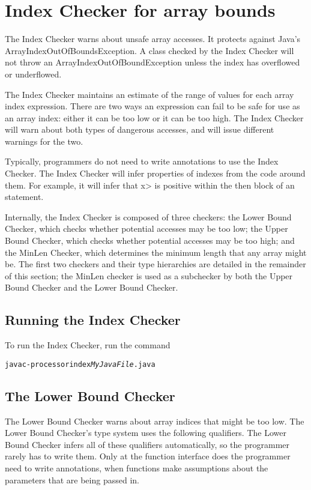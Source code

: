\chapter{Index Checker for array bounds\label{index-checker}}

The Index Checker warns about unsafe array accesses.  It protects
against Java's ArrayIndexOutOfBoundsException. A class checked by the
Index Checker  will not throw an ArrayIndexOutOfBoundException unless the
index has overflowed or underflowed.

The Index Checker maintains an estimate of the range of values for each array
index expression.  There are two ways an expression can fail to be safe for use as an
array index: either it can be too low or it can be too high. The Index
Checker will warn about both types of dangerous accesses, and will
issue different warnings for the two.

Typically, programmers do not need to write annotations to use the
Index Checker. The Index Checker will infer properties of indexes from
the code around them.  For example, it will infer that \<x> is positive
within the then block of an  statement.

Internally, the Index Checker is composed of three checkers: the Lower
Bound Checker, which checks whether potential accesses may be too low;
the Upper Bound Checker, which checks whether potential accesses
may be too high; and the MinLen Checker, which determines the minimum
length that any array might be. The first two checkers and their type hierarchies are
detailed in the remainder of this section; the MinLen checker is used as a
subchecker by both the Upper Bound Checker and the Lower Bound Checker.

\section{Running the Index Checker\label{index-running}}

To run the Index Checker, run the command

\begin{alltt}
  javac -processor index \emph{MyJavaFile}.java
\end{alltt}


\section{The Lower Bound Checker\label{index-lowerbound}}

The Lower Bound Checker warns about array indices that might be
too low.  The
Lower Bound Checker's type system uses the following qualifiers.
The Lower Bound Checker infers all of these qualifiers automatically,
so the programmer rarely has to write them. Only at the function interface
does the programmer need to write annotations, when functions make assumptions
about the parameters that are being passed in.

